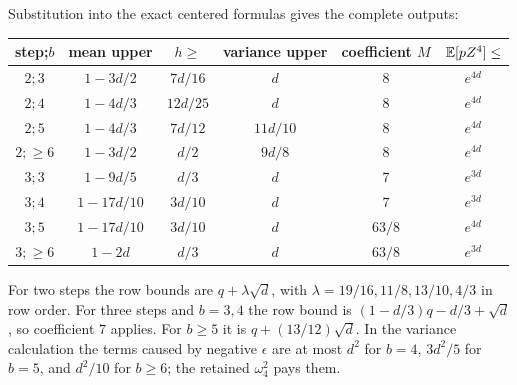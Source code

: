 Substitution into the exact centered formulas gives the complete outputs:
\begin{center}\small
\begin{tabular}{@{}cccccc@{}}\toprule
step;$b$&mean upper&$h\ge$&variance upper&coefficient $M$&$\mathbb E[pZ^4]\le$\\\midrule
$2;3$&$1-3d/2$&$7d/16$&$d$&$8$&$e^{4d}$\\
$2;4$&$1-4d/3$&$12d/25$&$d$&$8$&$e^{4d}$\\
$2;5$&$1-4d/3$&$7d/12$&$11d/10$&$8$&$e^{4d}$\\
$2;\ge6$&$1-3d/2$&$d/2$&$9d/8$&$8$&$e^{4d}$\\
$3;3$&$1-9d/5$&$d/3$&$d$&$7$&$e^{3d}$\\
$3;4$&$1-17d/10$&$3d/10$&$d$&$7$&$e^{3d}$\\
$3;5$&$1-17d/10$&$3d/10$&$d$&$63/8$&$e^{4d}$\\
$3;\ge6$&$1-2d$&$d/3$&$d$&$63/8$&$e^{3d}$\\\bottomrule
\end{tabular}
\end{center}
For two steps the row bounds are $q+\lambda\sqrt d$, with
$\lambda=19/16,11/8,13/10,4/3$ in row order.
For three steps and $b=3,4$ the row bound is
$(1-d/3)q-d/3+\sqrt d$, so coefficient $7$ applies.
For $b\ge5$ it is $q+(13/12)\sqrt d$.
In the variance calculation the terms caused by negative $\epsilon$ are
at most $d^2$ for $b=4$, $3d^2/5$ for $b=5$, and $d^2/10$ for $b\ge6$;
the retained $\omega_4^2$ pays them.

